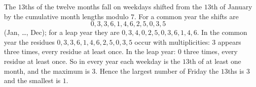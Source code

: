 The $13$ths of the twelve months fall on weekdays shifted from the $13$th of January by the cumulative month lengths modulo $7$. For a common year the shifts are
\[0,3,3,6,1,4,6,2,5,0,3,5\]
(Jan, \dots, Dec); for a leap year they are $0,3,4,0,2,5,0,3,6,1,4,6$. In the common year the residues $0,3,3,6,1,4,6,2,5,0,3,5$ occur with multiplicities: $3$ appears three times, every residue at least once. In the leap year: $0$ three times, every residue at least once. So in every year each weekday is the $13$th of at least one month, and the maximum is $3$. Hence the largest number of Friday the $13$ths is $\boxed{3}$ and the smallest is $\boxed{1}$.
